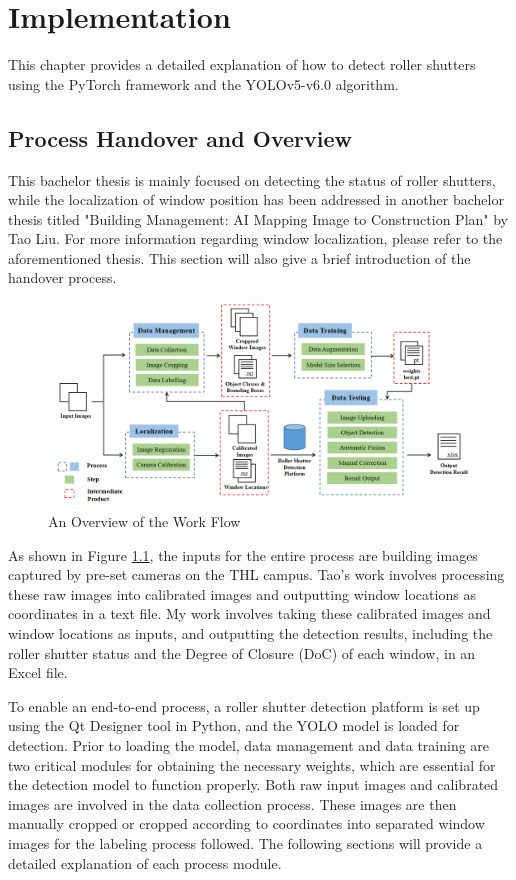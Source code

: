 \chapter{Implementation}

This chapter provides a detailed explanation of how to detect roller shutters using the PyTorch framework and the YOLOv5-v6.0 algorithm.

\section{Process Handover and Overview}

This bachelor thesis is mainly focused on detecting the status of roller shutters, while the localization of window position has been addressed in another bachelor thesis titled "Building Management: AI Mapping Image to Construction Plan" by Tao Liu. For more information regarding window localization, please refer to the aforementioned thesis. This section will also give a brief introduction of the handover process.

\begin{figure}[h]
  \centering
  \includegraphics[width=1\textwidth]{Figures/process overview.png}
  \caption{An Overview of the Work Flow}
  \label{fig:15}  
\end{figure}

As shown in Figure \ref{fig:15}, the inputs for the entire process are building images captured by pre-set cameras on the THL campus. Tao's work involves processing these raw images into calibrated images and outputting window locations as coordinates in a text file. My work involves taking these calibrated images and window locations as inputs, and outputting the detection results, including the roller shutter status and the Degree of Closure (DoC) of each window, in an Excel file.

To enable an end-to-end process, a roller shutter detection platform is set up using the Qt Designer tool in Python, and the YOLO model is loaded for detection. Prior to loading the model, data management and data training are two critical modules for obtaining the necessary weights, which are essential for the detection model to function properly. Both raw input images and calibrated images are involved in the data collection process. These images are then manually cropped or cropped according to coordinates into separated window images for the labeling process followed. The following sections will provide a detailed explanation of each process module.

